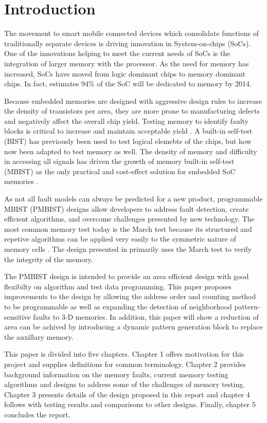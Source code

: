 \chapter{Introduction}
\label{chap:introduction}
The movement to smart mobile connected devices which consolidate functions of traditionally separate devices is driving innovation in System-on-chips (SoCs).  One of the innovations helping to meet the current needs of SoCs is the integration of larger memory with the processor.  As the need for memory has increased, SoCs have moved from logic dominant chips to memory dominant chips.  In fact, \cite{1327984} estimates 94\% of the SoC will be dedicated to memory by 2014.  

Because embedded memories are designed with aggressive design rules to increase the density of transistors per area, they are more prone to manufacturing defects and negatively affect the overall chip yield.  Testing memory to identify faulty blocks is critical to increase and maintain acceptable yield \cite{1395663}. 
A built-in self-test (BIST) has previously been used to test logical elemebts of the chips, but how now been adapted to test memory as well.  The density of memory and difficulty in accessing all signals has driven the growth of memory built-in self-test (MBIST) as the only practical and cost-effect solution for embedded SoC memories \cite{5875994}.  

As not all fault models can always be predicted for a new product, programmable MBIST (PMBIST) designs allow developers to address fault detection, create efficient algorithms, and overcome challenges presented by new technology.  The most common memory test today is the March test because its structured and repetive algorithms can be applied very easily to the symmetric nature of memory cells \cite{1675150}.  The design presented in \cite{1584083} primarily uses the March test to verify the integrity of the memory.  

The PMBIST design \cite{1584083} is intended to provide an area efficient design with good flexibilty on algorithm and test data programming.  This paper proposes improvements to the design by allowing the address order and counting method to be programmable as well as expanding the detection of neighborhood pattern-sensitive faults to 3-D memories.  In addition, this paper will show a reduction of area can be achived by introducing a dynamic pattern generation block to replace the auxillary memory.  

This paper is divided into five chapters.
Chapter 1 offers motivation for this project and supplies definitions for common terminology.  Chapter 2 provides background information on the memory faults, current memory testing algorithms and designs to address some of the challenges of memory testing.  Chapter 3 presents details of the design proposed in this report and chapter 4 follows with testing results and comparisons to other designs.
Finally, chapter 5 concludes the report.  





